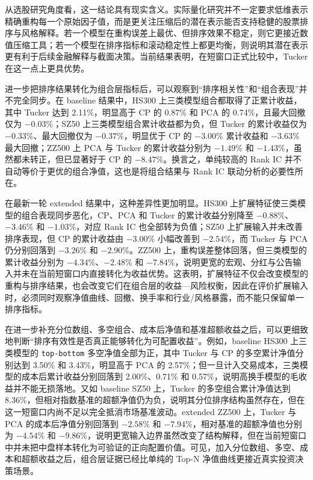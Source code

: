 从选股研究角度看，这一结论具有现实含义。实际量化研究并不一定要求低维表示精确重构每一个原始因子值，而是更关注压缩后的潜在表示能否支持稳健的股票排序与风格解释。若一个模型在重构误差上最优、但排序效果不稳定，则它更接近数值压缩工具；若一个模型在排序指标和滚动稳定性上都更均衡，则说明其潜在表示更有利于后续金融解释与截面决策。当前结果表明，在短窗口正式比较中，Tucker 在这一点上更具优势。

进一步把排序结果转化为组合层指标后，可以观察到“排序相关性”和“组合表现”并不完全同步。在 baseline 结果中，HS300 上三类模型组合都取得了正累计收益，其中 Tucker 达到 2.11\%，明显高于 CP 的 0.87\% 和 PCA 的 0.74\%，且最大回撤仅为 $-0.03\%$；SZ50 上三类模型组合累计收益都为负，但 Tucker 的累计收益仅为 $-0.33\%$、最大回撤仅为 $-0.37\%$，明显优于 CP 的 $-3.00\%$ 累计收益和 $-3.63\%$ 最大回撤；ZZ500 上 PCA 与 Tucker 的累计收益分别为 $-1.49\%$ 和 $-1.43\%$，虽然都未转正，但已显著好于 CP 的 $-8.47\%$。换言之，单纯较高的 Rank IC 并不自动等价于更优的组合净值，这也是将组合结果与 Rank IC 联动分析的必要性所在。

在最新一轮 extended 结果中，这种差异性更加明显。HS300 上扩展特征使三类模型的组合表现同步恶化，CP、PCA 和 Tucker 的累计收益分别降至 $-0.88\%$、$-3.46\%$ 和 $-1.03\%$，对应 Rank IC 也全部转为负值；SZ50 上扩展输入并未改善排序表现，但 CP 的累计收益由 $-3.00\%$ 小幅改善到 $-2.54\%$，而 Tucker 与 PCA 仍分别回落到 $-3.26\%$ 和 $-2.90\%$。ZZ500 上，重构误差整体回落，但三类模型的累计收益分别为 $-4.34\%$、$-2.48\%$ 和 $-7.84\%$，说明更宽的宏观、分红与公告输入并未在当前短窗口内直接转化为收益优势。这表明，扩展特征不仅会改变模型的重构与排序结果，也会改变它们在组合层的收益—风险权衡，因此在评价扩展输入时，必须同时观察净值曲线、回撤、换手率和行业/风格暴露，而不能只保留单一排序指标。

在进一步补充分位数组、多空组合、成本后净值和基准超额收益之后，可以更细致地判断“排序有效性是否真正能够转化为可配置收益”。例如，baseline HS300 上三类模型的 \texttt{top-bottom} 多空净值全部为正，其中 Tucker 与 CP 的多空累计净值分别达到 3.50\% 和 3.43\%，明显高于 PCA 的 2.57\%；但一旦计入交易成本，三类模型的成本后累计收益分别回落到 2.00\%、0.71\% 和 0.57\%，说明高换手模型的毛收益并不能无损落地。又如 baseline SZ50 上，Tucker 的多空组合累计净值达到 8.36\%，但相对指数基准的超额净值仍为负，说明其分位排序结构虽然存在，但在这一短窗口内尚不足以完全抵消市场基准波动。extended ZZ500 上，Tucker 与 PCA 的成本后净值分别回落到 $-2.58\%$ 和 $-7.94\%$，相对基准的超额净值也分别为 $-4.54\%$ 和 $-9.86\%$，说明更宽输入边界虽然改变了结构解释，但在当前短窗口中并未把中盘样本转化为可验证的正向配置价值。可见，加入分位数组、多空、成本和超额收益之后，组合层证据已经比单纯的 Top-N 净值曲线更接近真实投资决策场景。

